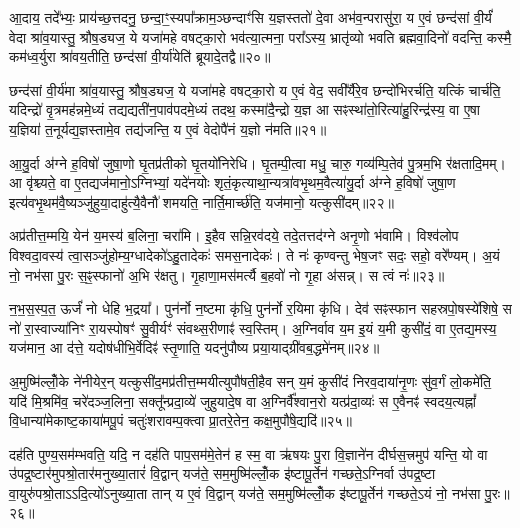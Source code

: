 आ॒दाय॒ तदे᳚भ्यः॒ प्राय॑च्छ॒त्तदनु॒ छन्दा॒ꣳ॒स्यपा᳚क्राम॒ञ्छन्दाꣳ॑सि य॒ज्ञस्ततो॑ दे॒वा अभ॑व॒न्परासु॑रा॒ य ए॒वं छन्द॑सां वी॒र्यं॑ वेदा श्रा॑व॒यास्तु॒ श्रौष॒ड्यज॒ ये यजा॑महे वषट्का॒रो भव॑त्या॒त्मना॒ परा᳚\-ऽस्य॒ भ्रातृ॑व्यो भवति ब्रह्मवा॒दिनो॑ वदन्ति॒ कस्मै॒ कम॑ध्व॒र्युरा श्रा॑वय॒तीति॒ छन्द॑सां वी॒र्या॑येति॑ ब्रूयादे॒तद्वै॥२०॥

छन्द॑सां वी॒र्य॑मा श्रा॑व॒यास्तु॒ श्रौष॒ड्यज॒ ये यजा॑महे वषट्का॒रो य ए॒वं वेद॒ सवी᳚र्यैरे॒व छन्दो॑भिरर्चति॒ यत्किं चार्च॑ति॒ यदिन्द्रो॑ वृ॒त्रमह॑न्नमे॒ध्यं तद्यद्यती॑न॒पाव॑पदमे॒ध्यं तदथ॒ कस्मा॑दै॒न्द्रो य॒ज्ञ आ सꣴस्था॑तो॒रित्या॑हु॒रिन्द्र॑स्य॒ वा ए॒षा य॒ज्ञिया॑ त॒नूर्यद्य॒ज्ञस्तामे॒व तद्य॑जन्ति॒ य ए॒वं वेदोपै॑नं य॒ज्ञो न॑मति॥२१॥

{\anuvakamend[{स छन्द॑सां वी॒र्यं॑ वा ए॒व तद॒ष्टौ च॑॥७॥}]}

आ॒यु॒र्दा अ॑ग्ने ह॒विषो॑ जुषा॒णो घृ॒तप्र॑तीको घृ॒तयो॑निरेधि। घृ॒तम्पी॒त्वा मधु॒ चारु॒ गव्य॑म्पि॒तेव॑ पु॒त्रम॒भि र॑क्षतादि॒मम्। आ वृ॑श्च्यते॒ वा ए॒तद्यज॑मानो॒\-ऽग्निभ्यां॒ यदे॑नयोः शृतं॒कृत्याथा॒न्यत्रा॑वभृ॒थम॒वैत्या॑यु॒र्दा अ॑ग्ने ह॒विषो॑ जुषा॒ण इत्य॑वभृ॒थम॑वै॒ष्यञ्जु॑हुया॒दाहु॑त्यै॒वैनौ॑ शमयति॒ नार्ति॒मार्च्छ॑ति॒ यज॑मानो॒ यत्कुसी॑दम्॥२२॥

अप्र॑तीत्त॒म्मयि॒ येन॑ य॒मस्य॑ ब॒लिना॒ चरा॑मि। इ॒हैव सन्नि॒रव॑दये॒ तदे॒तत्तद॑ग्ने अनृ॒णो भ॑वामि। विश्व॑लोप विश्वदा॒वस्य॑ त्वा॒सञ्जु॑होम्य॒ग्धादेको॑\-ऽहु॒तादेकः॑ समस॒नादेकः॑। ते नः॑ कृण्वन्तु भेष॒जꣳ सदः॒ सहो॒ वरे᳚ण्यम्। अ॒यं नो॒ नभ॑सा पु॒रः स॒ꣴ॒स्फानो॑ अ॒भि र॑क्षतु। गृ॒हाणा॒मस॑मर्त्यै ब॒हवो॑ नो गृ॒हा अ॑सन्न्। स त्वं नः॑॥२३॥

न॒भ॒स॒स्प॒त॒ ऊर्जं॑ नो धेहि भ॒द्रया᳚। पुन॑र्नो न॒ष्टमा कृ॑धि॒ पुन॑र्नो र॒यिमा कृ॑धि। देव॑ सꣴस्फान सहस्रपो॒षस्ये॑शिषे॒ स नो॑ रा॒स्वाज्या॑निꣳ रा॒यस्पोषꣳ॑ सु॒वीर्यꣳ॑ संवथ्स॒रीणाꣴ॑ स्व॒स्तिम्। अ॒ग्निर्वाव य॒म इ॒यं य॒मी कुसी॑दं॒ वा ए॒तद्य॒मस्य॒ यज॑मान॒ आ द॑त्ते॒ यदोष॑धीभि॒र्वेदिꣴ॑ स्तृ॒णाति॒ यदनु॑पौष्य प्रया॒याद्ग्री॑वब॒द्धमे॑नम्॥२४॥

अ॒मुष्मि॑ल्लोँ॒के ने॑नीयेर॒न् यत्कुसी॑द॒मप्र॑तीत्त॒म्मयीत्युपौ॑षती॒हैव सन् य॒मं कुसी॑दं निरव॒दाया॑नृ॒णः सु॑व॒र्गं लो॒कमे॑ति॒ यदि॑ मि॒श्रमि॑व॒ चरे॑दञ्ज॒लिना॒ सक्तू᳚न्प्रदा॒व्ये॑ जुहुयादे॒ष वा अ॒ग्निर्वै᳚श्वान॒रो यत्प्र॑दा॒व्यः॑ स ए॒वैनꣴ॑ स्वदय॒त्यह्नां᳚ वि॒धान्या॑मेकाष्ट॒काया॑मपू॒पं चतुः॑शरावम्प॒क्त्वा प्रा॒तरे॒तेन॒ कक्ष॒मुपौ॑षे॒द्यदि॑॥२५॥

दह॑ति पुण्य॒सम॑म्भवति॒ यदि॒ न दह॑ति पाप॒सम॑मे॒तेन॑ ह स्म॒ वा ऋ॑षयः पु॒रा वि॒ज्ञाने॑न दीर्घस॒त्त्रमुप॑ यन्ति॒ यो वा उ॑पद्र॒ष्टार॑मुपश्रो॒तार॑मनुख्या॒तारं॑ वि॒द्वान् यज॑ते॒ सम॒मुष्मि॑ल्लोँ॒क इ॑ष्टापू॒र्तेन॑ गच्छते॒\-ऽग्निर्वा उ॑पद्र॒ष्टा वा॒युरु॑पश्रो॒ता\-ऽ\-ऽ\-दि॒त्यो॑\-ऽनुख्या॒ता तान् य ए॒वं वि॒द्वान् यज॑ते॒ सम॒मुष्मि॑ल्लोँ॒क इ॑ष्टापू॒र्तेन॑ गच्छते॒\-ऽयं नो॒ नभ॑सा पु॒रः॥२६॥

